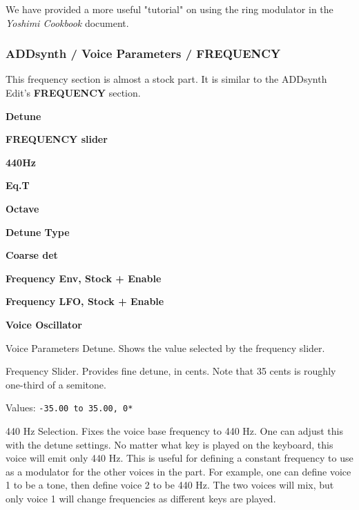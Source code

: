    We have provided a more useful "tutorial" on using the ring modulator in the
   \textsl{Yoshimi Cookbook} \cite{cookbook} document.

\subsubsection{ADDsynth / Voice Parameters / FREQUENCY}
\label{subsubsec:addsynth_voice_parameters_frequency}

   This frequency section is almost a stock part.
   It is similar to the ADDsynth Edit's \textbf{FREQUENCY} section.

   \begin{enumber}
      \item \textbf{Detune}
      \item \textbf{FREQUENCY slider}
      \item \textbf{440Hz}          %
      \item \textbf{Eq.T}          %
      \item \textbf{Octave}
      \item \textbf{Detune Type}
      \item \textbf{Coarse det}
      \item \textbf{Frequency Env, Stock + Enable}
      \item \textbf{Frequency LFO, Stock + Enable}
      \item \textbf{Voice Oscillator}
   \end{enumber}

   \setcounter{ItemCounter}{0}      %

   Voice Parameters Detune.
   Shows the value selected by the frequency slider.

   Frequency Slider.
   Provides fine detune, in cents.
   Note that 35 cents is roughly one-third of a semitone.

   Values: \texttt{-35.00 to 35.00, 0*}

   440 Hz Selection.
   Fixes the voice base frequency to 440 Hz.
   One can adjust this with the detune settings.
   No matter what key is played on the keyboard, this voice will emit only
   440 Hz.  This is useful for defining a constant frequency to use as a
   modulator for the other voices in the part.
   For example, one can define voice 1 to be a tone, then
   define voice 2 to be 440 Hz.  The two voices will mix, but only voice 1
   will change frequencies as different keys are played.

